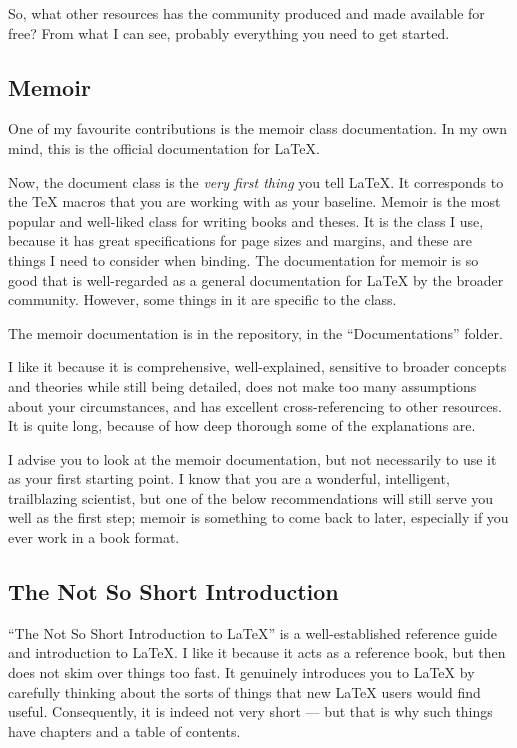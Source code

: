 \documentclass[11pt, oneside]{memoir}
\begin{document}
So, what other resources has the community produced and made available for free? From what I can see, probably everything you need to get started.

\subsection{Memoir}

One of my favourite contributions is the memoir class documentation. In my own mind, this is the official documentation for LaTeX.

Now, the document class is the \emph{very first thing} you tell LaTeX. It corresponds to the TeX macros that you are working with as your baseline. Memoir is the most popular and well-liked class for writing books and theses. It is the class I use, because it has great specifications for page sizes and margins, and these are things I need to consider when binding. The documentation for memoir is so good that is well-regarded as a general documentation for LaTeX by the broader community. However, some things in it are specific to the class.

The memoir documentation is in the repository, in the  ``Documentations'' folder. 

I like it because it is comprehensive, well-explained, sensitive to broader concepts and theories while still being detailed, does not make too many assumptions about your circumstances, and has excellent cross-referencing to other resources. It is quite long, because of how deep thorough some of the explanations are.

I advise you to look at the memoir documentation, but not necessarily to use it as your first starting point. I know that you are a wonderful, intelligent, trailblazing scientist, but one of the below recommendations will still serve you well as the first step; memoir is something to come back to later, especially if you ever work in a book format.

\subsection{The Not So Short Introduction}

``The Not So Short Introduction to LaTeX'' is a well-established reference guide and introduction to LaTeX. I like it because it acts as a reference book, but then does not skim over things too fast. It genuinely introduces you to LaTeX by carefully thinking about the sorts of things that new LaTeX users would find useful. Consequently, it is indeed not very short — but that is why such things have chapters and a table of contents.
\end{document}
